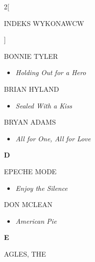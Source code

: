 \documentclass[a4paper]{report}
\begin{document}
\begin{multicols*}{2}[\begin{Huge}INDEKS WYKONAWCW\end{Huge}\vspace{1cm}]
\begin{minipage}{\columnwidth}
	BONNIE TYLER 
	\begin{itemize}[topsep=3pt, after=\vspace{3mm}]
		\itemsep0em
		\item[]\textit{Holding Out for a Hero}  \\
	\end{itemize}
\end{minipage}
\begin{minipage}{\columnwidth}
	BRIAN HYLAND 
	\begin{itemize}[topsep=3pt, after=\vspace{3mm}]
		\itemsep0em
		\item[]\textit{Sealed With a Kiss}  \\
	\end{itemize}
\end{minipage}
\begin{minipage}{\columnwidth}
	BRYAN ADAMS 
	\begin{itemize}[topsep=3pt, after=\vspace{3mm}]
		\itemsep0em
		\item[]\textit{All for One, All for Love}  \\
	\end{itemize}
\end{minipage}
\begin{minipage}{\columnwidth}
	\begin{Large}\textbf{D}\end{Large}EPECHE MODE 
	\begin{itemize}[topsep=3pt, after=\vspace{3mm}]
		\itemsep0em
		\item[]\textit{Enjoy the Silence}  \\
	\end{itemize}
\end{minipage}
\begin{minipage}{\columnwidth}
	DON MCLEAN 
	\begin{itemize}[topsep=3pt, after=\vspace{3mm}]
		\itemsep0em
		\item[]\textit{American Pie}  \\
	\end{itemize}
\end{minipage}
\begin{minipage}{\columnwidth}
	\begin{Large}\textbf{E}\end{Large}AGLES, THE 
	\begin{itemize}[topsep=3pt, after=\vspace{3mm}]

\end{itemize}
\end{minipage}
\end{multicols*}
\end{document}

